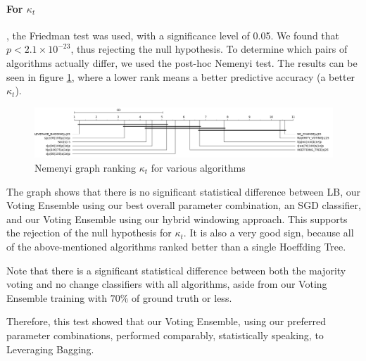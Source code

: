 \documentclass[runningheads]{llncs}
\begin{document}
\paragraph{For $\kappa_t$}

,  the Friedman test was used, with a significance level of 0.05. We found that $p < 2.1\times10^{-23}$, thus rejecting the null hypothesis.
To determine which pairs of algorithms actually differ, we used the post-hoc Nemenyi test. The results can be seen in figure \ref{fig:sota_compare_all_kappa_nemenyi}, where a lower rank means a better predictive accuracy (a better $\kappa_t$).

\begin{figure}
  \includegraphics[width=\linewidth]{./images/chapter5/sota_compare_all_kappa_nemenyi}
\caption{\label{fig:sota_compare_all_kappa_nemenyi}Nemenyi graph ranking $\kappa_t$ for various algorithms}
\end{figure}


The graph shows that there is no significant statistical difference between LB, our Voting Ensemble using our best overall parameter combination, an SGD classifier, and our Voting Ensemble using our hybrid windowing approach. This supports the rejection of the null hypothesis for $\kappa_t$. It is also a very good sign, because all of the above-mentioned algorithms ranked better than a single Hoeffding Tree.

Note that there is a significant statistical difference between both the majority voting and no change classifiers with all algorithms, aside from our Voting Ensemble training with $70\%$ of ground truth or less.

Therefore, this test showed that our Voting Ensemble, using our preferred parameter combinations, performed comparably, statistically speaking, to Leveraging Bagging.
\end{document}
